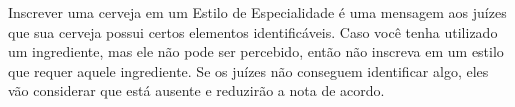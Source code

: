 Inscrever uma cerveja em um Estilo de Especialidade é uma mensagem aos juízes que sua cerveja possui certos elementos identificáveis. Caso você tenha utilizado um ingrediente, mas ele não pode ser percebido, então não inscreva em um estilo que requer aquele ingrediente. Se os juízes não conseguem identificar algo, eles vão considerar que está ausente e reduzirão a nota de acordo.